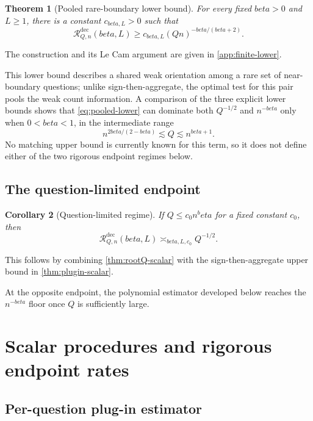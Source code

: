 \documentclass[11pt]{article}
\def\beta{beta}%
\newtheorem{theorem}{Theorem}[section]
\newtheorem{corollary}[theorem]{Corollary}
\newcommand{\calR}{\mathcal R}
\begin{document}
\begin{theorem}[Pooled rare-boundary lower bound]
\label{thm:pooled-lower}
For every fixed $\beta>0$ and $L\ge1$, there is a constant $c_{\beta,L}>0$ such that
\begin{equation}
\label{eq:pooled-lower}
\calR^{\mathrm{dec}}_{Q,n}(\beta,L)
\ge
c_{\beta,L}(Qn)^{-\beta/(\beta+2)}.
\end{equation}
\end{theorem}
The construction and its Le Cam argument are given in \cref{app:finite-lower}.

This lower bound describes a shared weak orientation among a rare set of near-boundary questions; unlike sign-then-aggregate, the optimal test for this pair pools the weak count information.  A comparison of the three explicit lower bounds shows that \eqref{eq:pooled-lower} can dominate both $Q^{-1/2}$ and $n^{-\beta}$ only when $0<\beta<1$, in the intermediate range
\[
n^{2\beta/(2-\beta)}
\lesssim Q
\lesssim n^{\beta+1}.
\]
No matching upper bound is currently known for this term, so it does not define either of the two rigorous endpoint regimes below.

\subsection{The question-limited endpoint}

\begin{corollary}[Question-limited regime]
\label{cor:question-limited}
If $Q\le c_0 n^\beta$ for a fixed constant $c_0$, then
\begin{equation}
\label{eq:question-limited}
\calR^{\mathrm{dec}}_{Q,n}(\beta,L)
\asymp_{\beta,L,c_0}
Q^{-1/2}.
\end{equation}
\end{corollary}
This follows by combining \cref{thm:rootQ-scalar} with the sign-then-aggregate upper bound in \cref{thm:plugin-scalar}.

At the opposite endpoint, the polynomial estimator developed below reaches the $n^{-\beta}$ floor once $Q$ is sufficiently large.

\section{Scalar procedures and rigorous endpoint rates}
\label{sec:scalar-estimators}

\subsection{Per-question plug-in estimator}
\end{document}
